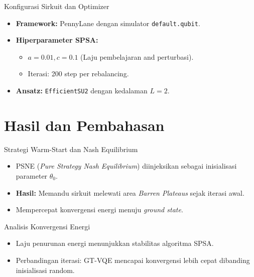 \documentclass[aspectratio=169]{beamer}
\begin{document}
\begin{frame}{Konfigurasi Sirkuit  dan   Optimizer}
    \begin{itemize}
        \item \textbf{Framework:} PennyLane dengan simulator \texttt{default.qubit}.
        \item \textbf{Hiperparameter SPSA:}
        \begin{itemize}
            \item $a = 0.01, c = 0.1$ (Laju pembelajaran and perturbasi).
            \item Iterasi: 200 step per rebalancing.
        \end{itemize}
        \item \textbf{Ansatz:} \texttt{EfficientSU2} dengan kedalaman $L=2$.
    \end{itemize}
\end{frame}
\section{Hasil dan  Pembahasan}

\begin{frame}{Strategi Warm-Start  dan   Nash Equilibrium}
    \begin{itemize}
        \item PSNE (\textit{Pure Strategy Nash Equilibrium}) diinjeksikan sebagai inisialisasi parameter $\theta_0$.
        \item \textbf{Hasil:} Memandu sirkuit melewati area \textit{Barren Plateaus} sejak iterasi awal.
        \item Mempercepat konvergensi energi menuju \textit{ground state}.
    \end{itemize}
\end{frame}

\begin{frame}{Analisis Konvergensi Energi}
    \begin{itemize}
        \item Laju penurunan energi menunjukkan stabilitas algoritma SPSA.
        \item Perbandingan iterasi: GT-VQE mencapai konvergensi lebih cepat dibanding inisialisasi random.
    \end{itemize}
\end{frame}
\end{document}
